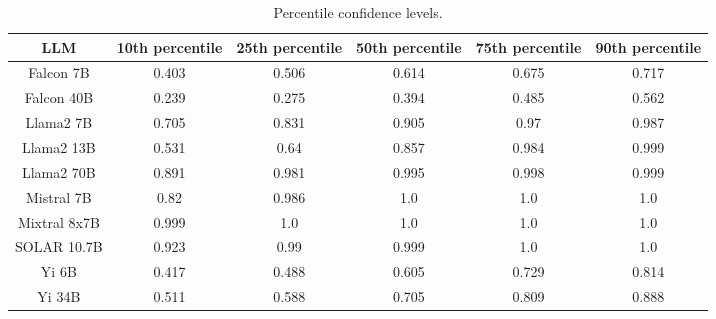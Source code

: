 \begin{table*}
\centering
\begin{tabular}{c|c|c|c|c|c}
LLM & 10th percentile & 25th percentile & 50th percentile & 75th percentile & 90th percentile\\ \hline
Falcon 7B & 0.403 & 0.506 & 0.614 & 0.675 & 0.717\\
Falcon 40B & 0.239 & 0.275 & 0.394 & 0.485 & 0.562\\
Llama2 7B & 0.705 & 0.831 & 0.905 & 0.97 & 0.987\\
Llama2 13B & 0.531 & 0.64 & 0.857 & 0.984 & 0.999\\
Llama2 70B & 0.891 & 0.981 & 0.995 & 0.998 & 0.999\\
Mistral 7B & 0.82 & 0.986 & 1.0 & 1.0 & 1.0\\
Mixtral 8x7B & 0.999 & 1.0 & 1.0 & 1.0 & 1.0\\
SOLAR 10.7B & 0.923 & 0.99 & 0.999 & 1.0 & 1.0\\
Yi 6B & 0.417 & 0.488 & 0.605 & 0.729 & 0.814\\
Yi 34B & 0.511 & 0.588 & 0.705 & 0.809 & 0.888\\
\hline
\end{tabular}
\caption{Percentile confidence levels.}
\label{tab:percentile_conf}
\end{table*}
